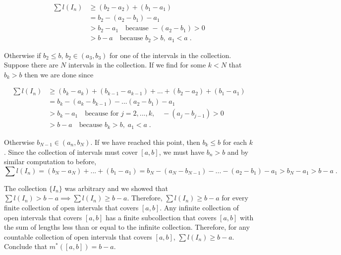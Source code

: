 \documentclass[a4paper]{article}
\begin{document}
\begin{align*}
\sum l(I_n) &\geq (b_2 - a_2) + (b_1 - a_1)\\
&= b_2 -(a_2 - b_1) - a_1 \\
&> b_2 - a_1 \quad \text{because } -(a_2 - b_1) > 0 \\
&> b-a \quad \text{because } b_2>b, \; a_1<a \;.
\end{align*}

Otherwise if $b_2\leq b$, $b_2 \in (a_3,b_3)$ for one of the intervals in the collection. Suppose there are $N$ intervals in the collection. If we find for some $k<N$ that $b_k > b$ then we are done since

\begin{align*}
\sum l(I_n) &\geq (b_k - a_k) + (b_{k-1} - a_{k-1}) + ...+(b_2 - a_2) + (b_1 - a_1)\\
&= b_k -(a_{k} - b_{k-1}) - ...(a_2 - b_1) - a_1 \\
&> b_k - a_1 \quad \text{because for } j=2,...,k, \quad  -(a_{j} - b_{j-1}) > 0  \\
&> b-a \quad \text{because } b_k>b, \; a_1<a \;.
\end{align*}

Otherwise $b_{N-1} \in (a_n,b_N)$. If we have reached this point, then $b_k \leq b$ for each $k$. Since the collection of intervals must cover $[a,b]$, we must have $b_n > b$ and by similar computation to before,
$$\sum l(I_n) = (b_N - a_N) + ... + (b_1 - a_1) = b_N - (a_N - b_{N-1}) - ... - (a_2 -b_1) - a_1 > b_N - a_1 > b-a \;.$$

The collection $\{I_n\}$ was arbitrary and we showed that $\sum l(I_n) > b-a \implies \sum l(I_n) \geq b-a$. Therefore, $\sum l(I_n) \geq b-a$ for every finite collection of open intervals that covers $[a,b]$. Any infinite collection of open intervals that covers $[a,b]$ has a finite subcollection that covers $[a,b]$ with the sum of lengths less than or equal to the infinite collection. Therefore, for any countable collection of open intervals that covers $[a,b]$, $\sum l(I_n) \geq b-a$. Conclude that $m^*([a,b]) = b-a$.\\
\end{document}
